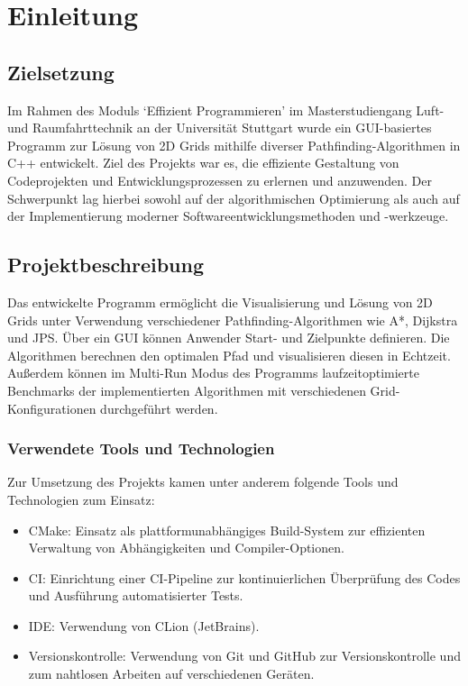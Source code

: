 \chapter{Einleitung}
\label{ch:einleitung}

\section{Zielsetzung}
\label{sec:motivation}
Im Rahmen des Moduls `Effizient Programmieren' im Masterstudiengang Luft- und Raumfahrttechnik an der Universität Stuttgart
wurde ein GUI-basiertes Programm zur Lösung von 2D Grids mithilfe diverser Pathfinding-Algorithmen in C++ entwickelt.
Ziel des Projekts war es, die effiziente Gestaltung von Codeprojekten und Entwicklungsprozessen zu erlernen und anzuwenden.
Der Schwerpunkt lag hierbei sowohl auf der algorithmischen Optimierung als auch auf der Implementierung moderner Softwareentwicklungsmethoden und -werkzeuge.

\section{Projektbeschreibung}
\label{sec:beschreibung}
Das entwickelte Programm ermöglicht die Visualisierung und Lösung von 2D Grids unter Verwendung verschiedener Pathfinding-Algorithmen wie A*, Dijkstra und \ac{JPS}.
Über ein \ac{GUI} können Anwender Start- und Zielpunkte definieren.
Die Algorithmen berechnen den optimalen Pfad und visualisieren diesen in Echtzeit.
Außerdem können im Multi-Run Modus des Programms laufzeitoptimierte Benchmarks der implementierten Algorithmen mit verschiedenen Grid-Konfigurationen durchgeführt werden.
\subsection*{Verwendete Tools und Technologien}
Zur Umsetzung des Projekts kamen unter anderem folgende Tools und Technologien zum Einsatz:
\begin{itemize}
\item CMake: Einsatz als plattformunabhängiges Build-System zur effizienten Verwaltung von Abhängigkeiten und Compiler-Optionen.
\item \ac{CI}: Einrichtung einer CI-Pipeline zur kontinuierlichen Überprüfung des Codes und Ausführung automatisierter Tests.
\item \ac{IDE}: Verwendung von CLion (JetBrains).
\item Versionskontrolle: Verwendung von Git und GitHub zur Versionskontrolle und zum nahtlosen Arbeiten auf verschiedenen Geräten.
\end{itemize}

